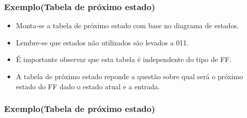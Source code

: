 \documentclass{beamer}
\begin{document}
\begin{frame}
 \frametitle{Exemplo(Tabela de próximo estado)} 
  \begin{itemize}
   \item Monta-se a tabela de próximo estado com base no diagrama de estados.\pause
   \item Lembre-se que estados não utilizados são levados a 011. \pause
   \item É importante observar que esta tabela é independente do tipo de FF.\pause
   \item A tabela de próximo estado reponde a questão sobre qual será o próximo estado do FF dado o estado atual e a entrada.
  \end{itemize}
\end{frame}
  \frametitle{Exemplo(Tabela de próximo estado)} 
  
\end{document}
